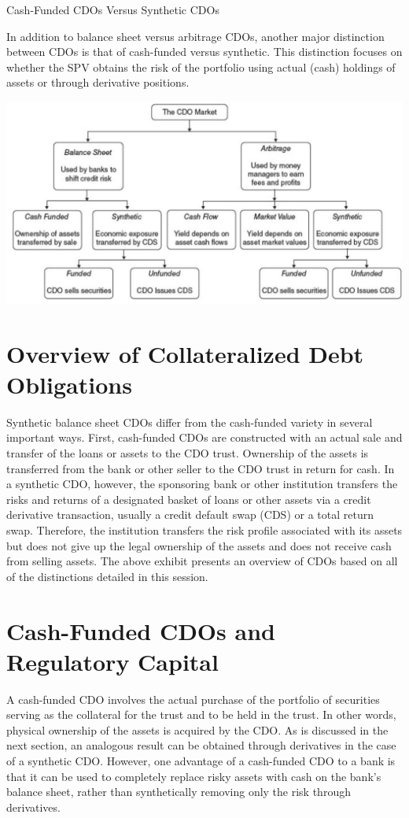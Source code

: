 \documentclass[11pt]{article}
\begin{document}
Cash-Funded CDOs Versus Synthetic CDOs

In addition to balance sheet versus arbitrage CDOs, another major distinction between CDOs is that of cash-funded versus synthetic. This distinction focuses on whether the SPV obtains the risk of the portfolio using actual (cash) holdings of assets or through derivative positions.

\begin{center}
\includegraphics[max width=\textwidth]{2024_04_10_376aee6eb3365ddfffeeg-2}
\end{center}

\section*{Overview of Collateralized Debt Obligations}
Synthetic balance sheet CDOs differ from the cash-funded variety in several important ways. First, cash-funded CDOs are constructed with an actual sale and transfer of the loans or assets to the CDO trust. Ownership of the assets is transferred from the bank or other seller to the CDO trust in return for cash. In a synthetic CDO, however, the sponsoring bank or other institution transfers the risks and returns of a designated basket of loans or other assets via a credit derivative transaction, usually a credit default swap (CDS) or a total return swap. Therefore, the institution transfers the risk profile associated with its assets but does not give up the legal ownership of the assets and does not receive cash from selling assets. The above exhibit presents an overview of CDOs based on all of the distinctions detailed in this session.

\section*{Cash-Funded CDOs and Regulatory Capital}
A cash-funded CDO involves the actual purchase of the portfolio of securities serving as the collateral for the trust and to be held in the trust. In other words, physical ownership of the assets is acquired by the CDO. As is discussed in the next section, an analogous result can be obtained through derivatives in the case of a synthetic CDO. However, one advantage of a cash-funded CDO to a bank is that it can be used to completely replace risky assets with cash on the bank's balance sheet, rather than synthetically removing only the risk through derivatives.
\end{document}
